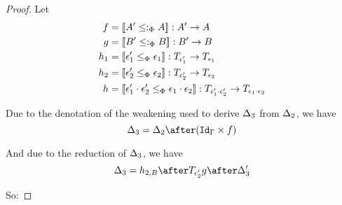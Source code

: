 \documentclass{Report}
\begin{document}
\begin{proof}
    Let \begin{align*}
        f & = \deno{A' \subtypep A}: A' \rightarrow A\\
        g & = \deno{B' \subtypep B}: B' \rightarrow B\\
        h_1 & = \deno{\e_1' \subeffectp \e_1} : \T{\e_1'}{} \rightarrow \T{\e_1}{} \\
        h_2 & = \deno{\e_2'\subeffectp \e_2}:\T{\e_2'}{} \rightarrow \T{\e_2}{}\\
        h & = \deno{\e_1'\dot\e_2'\subeffectp\e_1\dot\e_2}: \T{\e_1'\dot\e_2'}{}\rightarrow \T{\e_1\dot\e_2}{}
    \end{align*}

    Due to the denotation of the weakening used to derive $\Delta_3$ from $\Delta_2$, we have 
    \begin{equation}
        \D_3 = \D_2\after(\idg\times f)
    \end{equation}

    And due to the reduction of $\Delta_3$,
    we have 
    \begin{equation}
        \D_3 = h_{2, B} \after \T{\e_2'}{g}\after \D_3'
    \end{equation}

    So:


\end{proof}
\end{document}
